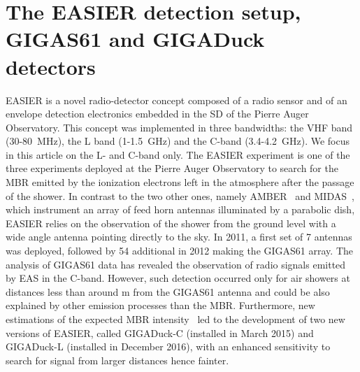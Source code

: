 \section{The EASIER detection setup, GIGAS61 and GIGADuck detectors}
\label{sec:setup}
EASIER is  a novel radio-detector  concept composed of a  radio sensor
and of  an envelope  detection electronics embedded  in the SD  of the
Pierre  Auger  Observatory.  This  concept  was  implemented in  three
bandwidths: the VHF  band (30-80~MHz), the L band  (1-1.5~GHz) and the
C-band (3.4-4.2~GHz).  We  focus in this article on  the L- and C-band
only. The EASIER  experiment is one of the  three experiments deployed
at the Pierre  Auger Observatory to search for the  MBR emitted by the
ionization electrons left  in the atmosphere after the  passage of the
shower. In  contrast to the two other  ones, namely AMBER~\cite{amber}
and  MIDAS~\cite{midas},  which  instrument  an  array  of  feed  horn
antennas  illuminated  by  a  parabolic  dish, EASIER  relies  on  the
observation  of the shower  from the  ground level  with a  wide angle
antenna  pointing directly  to the  sky.  In  2011, a  first set  of 7
antennas was  deployed, followed by  54 additional in 2012  making the
\mbox{GIGAS61}  array.   The  analysis  of  \mbox{GIGAS61}  data  has  revealed  the
observation    of   radio    signals   emitted    by   EAS    in   the
C-band\cite{amber}.  However,  such detection  occurred  only for  air
showers at  distances less than around \unit[200]{m}  from the \mbox{GIGAS61}
antenna and could  be also explained by other  emission processes than
the   MBR.   Furthermore,   new  estimations   of  the   expected  MBR
intensity~\cite{imen2015,imen2016} led  to the development  of two new
versions of  EASIER, called \mbox{GIGADuck-C}  (installed in March  2015) and
GIGADuck-L (installed in December  2016), with an enhanced sensitivity
to search for signal from larger distances hence fainter.

